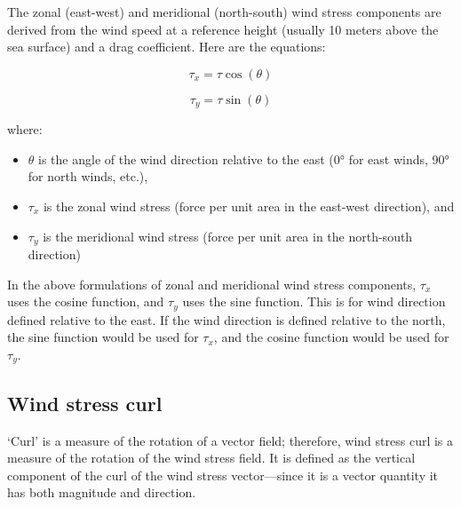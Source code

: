 \documentclass[
  letterpaper,
  DIV=11,
  numbers=noendperiod]{scrartcl}
\providecommand{\tightlist}{%
  \setlength{\itemsep}{0pt}\setlength{\parskip}{0pt}}\usepackage{longtable,booktabs,array}
\begin{document}
The zonal (east-west) and meridional (north-south) wind stress
components are derived from the wind speed at a reference height
(usually 10 meters above the sea surface) and a drag coefficient. Here
are the equations:

\[\tau_{x} = \tau \cos(\theta)\]

\[\tau_{y} = \tau \sin(\theta)\]

where:

\begin{itemize}
\tightlist
\item
  \(\theta\) is the angle of the wind direction relative to the east (0°
  for east winds, 90° for north winds, etc.),
\item
  \(\tau_x\) is the zonal wind stress (force per unit area in the
  east-west direction), and
\item
  \(\tau_y\) is the meridional wind stress (force per unit area in the
  north-south direction)
\end{itemize}

\begin{tcolorbox}[enhanced jigsaw, titlerule=0mm, rightrule=.15mm, opacityback=0, opacitybacktitle=0.6, colback=white, coltitle=black, arc=.35mm, left=2mm, leftrule=.75mm, toptitle=1mm, breakable, colframe=quarto-callout-note-color-frame, bottomtitle=1mm, toprule=.15mm, colbacktitle=quarto-callout-note-color!10!white, title=\textcolor{quarto-callout-note-color}{\faInfo}\hspace{0.5em}{Sine and cosine functions}, bottomrule=.15mm]

In the above formulations of zonal and meridional wind stress
components, \(\tau_x\) uses the cosine function, and \(\tau_y\) uses the
sine function. This is for wind direction defined relative to the east.
If the wind direction is defined relative to the north, the sine
function would be used for \(\tau_x\), and the cosine function would be
used for \(\tau_y\).

\end{tcolorbox}

\subsection{Wind stress curl}\label{wind-stress-curl}

`Curl' is a measure of the rotation of a vector field; therefore, wind
stress curl is a measure of the rotation of the wind stress field. It is
defined as the vertical component of the curl of the wind stress
vector---since it is a vector quantity it has both magnitude and
direction.
\end{document}
